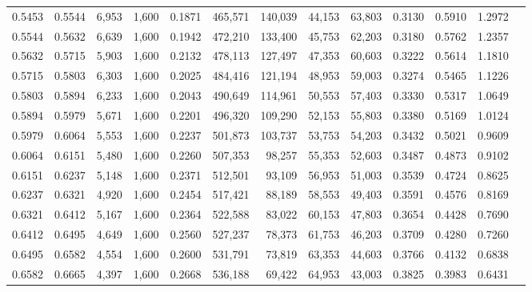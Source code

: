 \begin{tabular}{rrrrrrrrrrrrr}
0.5453 & 0.5544 &  6,953 & 1,600 &                                     0.1871 & 465,571 & 140,039 &  44,153 &  63,803 & 0.3130 & 0.5910 & 1.2972 \\
0.5544 & 0.5632 &  6,639 & 1,600 &                                     0.1942 & 472,210 & 133,400 &  45,753 &  62,203 & 0.3180 & 0.5762 & 1.2357 \\
0.5632 & 0.5715 &  5,903 & 1,600 &                                     0.2132 & 478,113 & 127,497 &  47,353 &  60,603 & 0.3222 & 0.5614 & 1.1810 \\
0.5715 & 0.5803 &  6,303 & 1,600 &                                     0.2025 & 484,416 & 121,194 &  48,953 &  59,003 & 0.3274 & 0.5465 & 1.1226 \\
0.5803 & 0.5894 &  6,233 & 1,600 &                                     0.2043 & 490,649 & 114,961 &  50,553 &  57,403 & 0.3330 & 0.5317 & 1.0649 \\
0.5894 & 0.5979 &  5,671 & 1,600 &                                     0.2201 & 496,320 & 109,290 &  52,153 &  55,803 & 0.3380 & 0.5169 & 1.0124 \\
0.5979 & 0.6064 &  5,553 & 1,600 &                                     0.2237 & 501,873 & 103,737 &  53,753 &  54,203 & 0.3432 & 0.5021 & 0.9609 \\
0.6064 & 0.6151 &  5,480 & 1,600 &                                     0.2260 & 507,353 &  98,257 &  55,353 &  52,603 & 0.3487 & 0.4873 & 0.9102 \\
0.6151 & 0.6237 &  5,148 & 1,600 &                                     0.2371 & 512,501 &  93,109 &  56,953 &  51,003 & 0.3539 & 0.4724 & 0.8625 \\
0.6237 & 0.6321 &  4,920 & 1,600 &                                     0.2454 & 517,421 &  88,189 &  58,553 &  49,403 & 0.3591 & 0.4576 & 0.8169 \\
0.6321 & 0.6412 &  5,167 & 1,600 &                                     0.2364 & 522,588 &  83,022 &  60,153 &  47,803 & 0.3654 & 0.4428 & 0.7690 \\
0.6412 & 0.6495 &  4,649 & 1,600 &                                     0.2560 & 527,237 &  78,373 &  61,753 &  46,203 & 0.3709 & 0.4280 & 0.7260 \\
0.6495 & 0.6582 &  4,554 & 1,600 &                                     0.2600 & 531,791 &  73,819 &  63,353 &  44,603 & 0.3766 & 0.4132 & 0.6838 \\
0.6582 & 0.6665 &  4,397 & 1,600 &                                     0.2668 & 536,188 &  69,422 &  64,953 &  43,003 & 0.3825 & 0.3983 & 0.6431 \\

\end{tabular}
